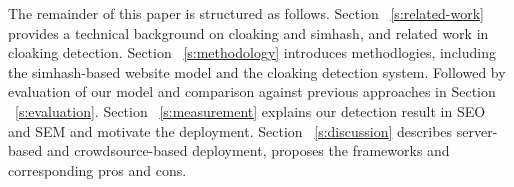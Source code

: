The remainder of this paper is structured as follows. Section
~\autoref{s:related-work} provides a
technical background on cloaking and simhash, and related work in cloaking
detection. Section ~\autoref{s:methodology} introduces methodlogies, including the simhash-based website
model and the cloaking detection system.
Followed by evaluation of our model and comparison against previous approaches
in Section ~\autoref{s:evaluation}.
Section ~\autoref{s:measurement} explains our detection result in SEO and SEM
and motivate the deployment.
Section ~\autoref{s:discussion} describes server-based and crowdsource-based
deployment, proposes the frameworks and corresponding pros and cons.

